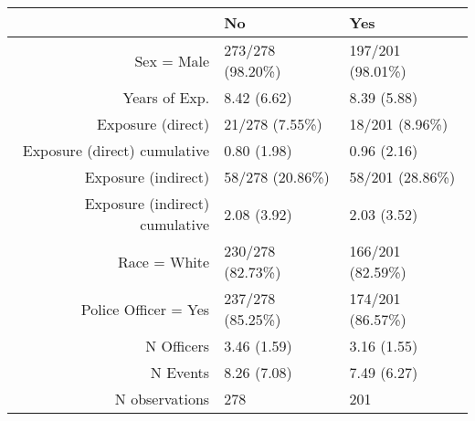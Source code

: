 \begin{table}[ht]
\centering
\begin{tabular}{rll}
  \toprule
 & No & Yes \\ 
  \midrule
Sex = Male & 273/278 (98.20\%) & 197/201 (98.01\%) \\ 
  Years of Exp. & 8.42 (6.62) & 8.39 (5.88) \\ 
  Exposure (direct) & 21/278 (7.55\%) & 18/201 (8.96\%) \\ 
  Exposure (direct) cumulative & 0.80 (1.98) & 0.96 (2.16) \\ 
  Exposure (indirect) & 58/278 (20.86\%) & 58/201 (28.86\%) \\ 
  Exposure (indirect) cumulative & 2.08 (3.92) & 2.03 (3.52) \\ 
  Race = White & 230/278 (82.73\%) & 166/201 (82.59\%) \\ 
  Police Officer = Yes & 237/278 (85.25\%) & 174/201 (86.57\%) \\ 
  N Officers & 3.46 (1.59) & 3.16 (1.55) \\ 
  N Events & 8.26 (7.08) & 7.49 (6.27) \\ 
  N observations & 278 & 201 \\ 
   \bottomrule
\end{tabular}
\end{table}
